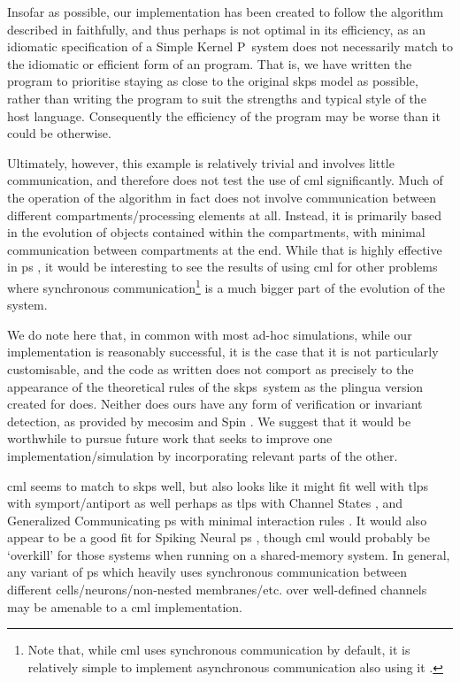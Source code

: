 Insofar as possible, our implementation has been created to follow the algorithm described in \cite{Gheorghe2013} faithfully, and thus perhaps is not optimal in its efficiency, as an idiomatic specification of a Simple Kernel P~system does not necessarily match to the idiomatic or efficient form of an \fsharp{} program.  That is, we have written the program to prioritise staying as close to the original \gls{skps} model as possible, rather than writing the program to suit the strengths and typical style of the host language.  Consequently the efficiency of the program may be worse than it could be otherwise.  

Ultimately, however, this example is relatively trivial and involves little communication, and therefore does not test the use of \gls{cml} significantly.  Much of the operation of the algorithm in fact does not involve communication between different compartments/processing elements at all.  Instead, it is primarily based in the evolution of objects contained within the compartments, with minimal communication between compartments at the end.  While that is highly effective in \gls{ps} \cite{Paun2008}, it would be interesting to see the results of using \gls{cml} for other problems where synchronous communication\footnote{Note that, while \gls{cml} uses synchronous communication by default, it is relatively simple to implement asynchronous communication also using it \cite{Reppy2007}.} is a much bigger part of the evolution of the system.

We do note here that, in common with most ad-hoc simulations, while our implementation is reasonably successful, it is the case that it is not particularly customisable, and the code as written does not comport as precisely to the appearance of the theoretical rules of the \gls{skps}~system as the \gls{plingua} version created for \cite{Gheorghe2013} does.  Neither does ours have any form of verification or invariant detection, as provided by \gls{mecosim} \cite{Perez-Hurtado2010} and Spin \cite{Ben-Ari2008,Lefticaru2011}.  We suggest that it would be worthwhile to pursue future work that seeks to improve one implementation/simulation by incorporating relevant parts of the other.

\gls{cml} seems to match to \gls{skps} well, but also looks like it might fit well with \gls{tlps} with symport/antiport \cite{Verlan2005} as well perhaps as \gls{tlps} with Channel States \cite{Song2016}, and Generalized Communicating \gls{ps} with minimal interaction rules \cite{Csuhaj-Varju2011}.  It would also appear to be a good fit for Spiking Neural \gls{ps} \cite{Ionescu2006}, though \gls{cml} would probably be `overkill' for those systems when running on a shared-memory system.  In general, any variant of \gls{ps} which heavily uses synchronous communication between different cells/neurons/non-nested membranes/etc. over well-defined channels may be amenable to a \gls{cml} implementation.

